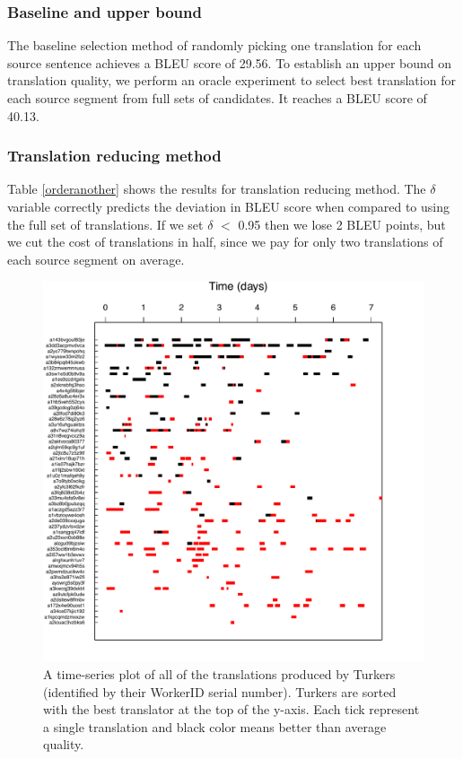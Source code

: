 \documentclass[11pt,letterpaper]{article}
\begin{document}
\subsubsection{Baseline and upper bound} 
The baseline selection method of randomly picking one translation for each source sentence achieves a BLEU score of 29.56. To establish an upper bound on translation quality, we perform an oracle experiment to select best translation for each source segment from full sets of candidates.  It reaches a BLEU score of 40.13.

\subsubsection{Translation reducing method} 

Table \ref{orderanother} shows the results for translation reducing method.  The $\delta$ variable correctly predicts the deviation in BLEU score when compared to using the full set of translations.   If we set $\delta$ $<$ 0.95 then we lose 2 BLEU points, but we cut the cost of translations in half, since we pay for only two translations of each source segment on average.


\begin{figure}
  \centering
  \includegraphics[width=\linewidth]{WorkerPerf/wp.pdf}
  \caption{A time-series plot of all of the translations produced by Turkers (identified by their WorkerID serial number). Turkers are sorted with the best translator at the top of the y-axis. Each tick represent a single translation and black color means better than average quality.
}
    \label{fworkerperf}
\end{figure}
\end{document}
